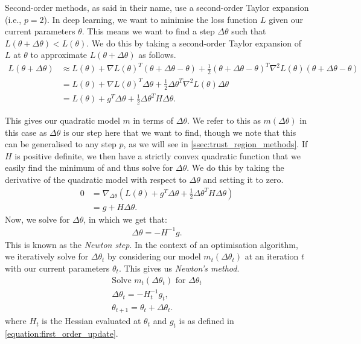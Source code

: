 Second-order methods, as said in their name, use a second-order Taylor expansion (i.e., $p = 2$). In deep learning, we want to minimise the loss function $L$ given our current parameters $\theta$. This means we want to find a step $\Delta \theta$ such that $L(\theta + \Delta \theta) < L(\theta)$. We do this by taking a second-order Taylor expansion of $L$ at $\theta$ to approximate $L(\theta + \Delta \theta)$ as follows.
\begin{align}
    L(\theta + \Delta \theta) &\approx L(\theta) + \nabla L(\theta)^T (\theta + \Delta \theta - \theta) + \frac{1}{2} (\theta + \Delta \theta - \theta)^T \nabla^2 L(\theta) (\theta + \Delta \theta - \theta) \\
    &= L(\theta) + \nabla L(\theta)^T \Delta \theta + \frac{1}{2} \Delta \theta^T \nabla^2 L(\theta) \Delta \theta \\
    &= L(\theta) + g^T \Delta \theta + \frac{1}{2} \Delta \theta^T H \Delta \theta.
    \label{equation:quadratic_model_w_loss}
\end{align}

This gives our quadratic model $m$ in terms of $\Delta \theta$. We refer to this as $m(\Delta \theta)$ in this case as $\Delta \theta$ is our step here that we want to find, though we note that this can be generalised to any step $p$, as we will see in \cref{ssec:trust_region_methods}. If $H$ is positive definite, we then have a strictly convex quadratic function that we easily find the minimum of and thus solve for $\Delta \theta$. We do this by taking the derivative of the quadratic model with respect to $\Delta \theta$ and setting it to zero.
\begin{align}
    0 &= \nabla_{\Delta \theta} \left( L(\theta) + g^T \Delta \theta + \frac{1}{2} \Delta \theta^T H \Delta \theta \right) \\
    &= g + H \Delta \theta.
\end{align}
Now, we solve for $\Delta \theta$, in which we get that:
\begin{align}
    \Delta \theta = - H^{-1} g.
\end{align} 
This is known as the \textit{Newton step}. In the context of an optimisation algorithm, we iteratively solve for $\Delta \theta_t$ by considering our model $m_t(\Delta \theta_t)$ at an iteration $t$ with our current parameters $\theta_t$. This gives us \textit{Newton's method}.
\begin{align}
    \text{Solve } m_t(\Delta \theta_t) \text{ for } \Delta \theta_t \\
    \Delta \theta_t = -H_t^{-1} g_t, \\
    \theta_{t+1} = \theta_t + \Delta \theta_t.
\end{align}
where $H_t$ is the Hessian evaluated at $\theta_t$ and $g_t$ is as defined in \cref{equation:first_order_update}.

